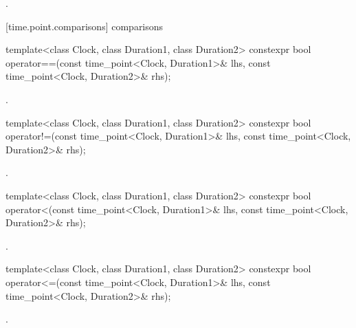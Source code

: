 \begin{itemdescr}
\pnum
\returns {}.
\end{itemdescr}

[time.point.comparisons]{ comparisons}

%
\begin{itemdecl}
template<class Clock, class Duration1, class Duration2>
  constexpr bool operator==(const time_point<Clock, Duration1>& lhs,
                            const time_point<Clock, Duration2>& rhs);
\end{itemdecl}

\begin{itemdescr}
\pnum
\returns {}.
\end{itemdescr}

%
\begin{itemdecl}
template<class Clock, class Duration1, class Duration2>
  constexpr bool operator!=(const time_point<Clock, Duration1>& lhs,
                            const time_point<Clock, Duration2>& rhs);
\end{itemdecl}

\begin{itemdescr}
\pnum
\returns {}.
\end{itemdescr}

%
\begin{itemdecl}
template<class Clock, class Duration1, class Duration2>
  constexpr bool operator<(const time_point<Clock, Duration1>& lhs,
                           const time_point<Clock, Duration2>& rhs);
\end{itemdecl}

\begin{itemdescr}
\pnum
\returns {}.
\end{itemdescr}

%
\begin{itemdecl}
template<class Clock, class Duration1, class Duration2>
  constexpr bool operator<=(const time_point<Clock, Duration1>& lhs,
                            const time_point<Clock, Duration2>& rhs);
\end{itemdecl}

\begin{itemdescr}
\pnum
\returns {}.
\end{itemdescr}

